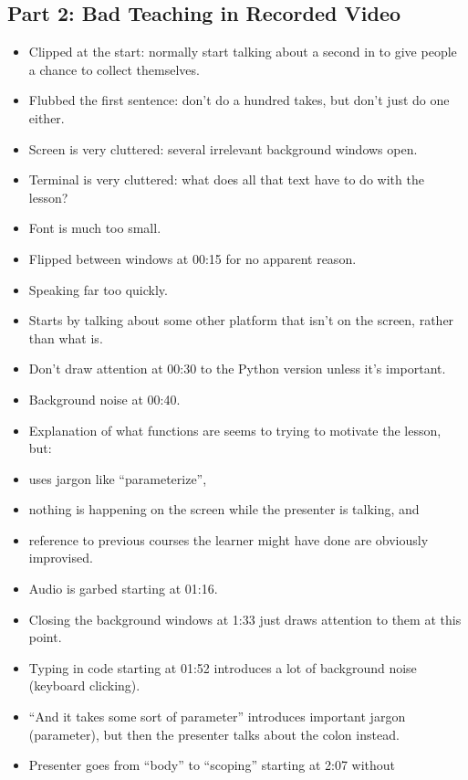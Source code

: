 \documentclass[10pt,statementpaper]{memoir}
\providecommand{\tightlist}{%
  \setlength{\itemsep}{0pt}\setlength{\parskip}{0pt}}
\begin{document}
\subsection*{Part 2: Bad Teaching in Recorded
Video}\label{part-2-bad-teaching-in-recorded-video}

\begin{itemize}
\tightlist
\item
  Clipped at the start: normally start talking about a second in to give
  people a chance to collect themselves.
\item
  Flubbed the first sentence: don't do a hundred takes, but don't just
  do one either.
\item
  Screen is very cluttered: several irrelevant background windows open.
\item
  Terminal is very cluttered: what does all that text have to do with
  the lesson?
\item
  Font is much too small.
\item
  Flipped between windows at 00:15 for no apparent reason.
\item
  Speaking far too quickly.
\item
  Starts by talking about some other platform that isn't on the screen,
  rather than what is.
\item
  Don't draw attention at 00:30 to the Python version unless it's
  important.
\item
  Background noise at 00:40.
\item
  Explanation of what functions are seems to trying to motivate the
  lesson, but:
\item
  uses jargon like ``parameterize'',
\item
  nothing is happening on the screen while the presenter is talking, and
\item
  reference to previous courses the learner might have done are
  obviously improvised.
\item
  Audio is garbed starting at 01:16.
\item
  Closing the background windows at 1:33 just draws attention to them at
  this point.
\item
  Typing in code starting at 01:52 introduces a lot of background noise
  (keyboard clicking).
\item
  ``And it takes some sort of parameter'' introduces important jargon
  (parameter), but then the presenter talks about the colon instead.
\item
  Presenter goes from ``body'' to ``scoping'' starting at 2:07 without

\end{itemize}
\end{document}
